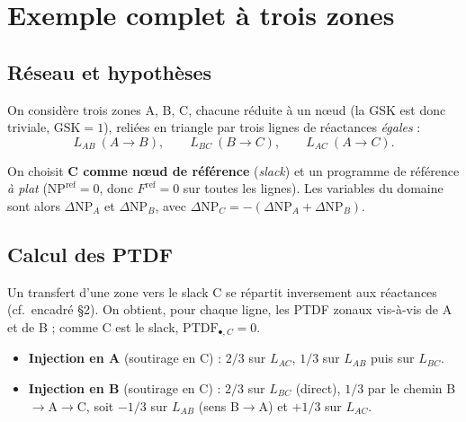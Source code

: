 \documentclass[11pt,a4paper]{article}
\newcommand{\NP}{\mathrm{NP}}
\newcommand{\PTDF}{\mathrm{PTDF}}
\newcommand{\Fref}{F^{\mathrm{ref}}}
\newcommand{\GSK}{\mathrm{GSK}}
\begin{document}
\section{Exemple complet à trois zones}
\label{sec:exemple}

\subsection{Réseau et hypothèses}

On considère trois zones A, B, C, chacune réduite à un n\oe{}ud (la GSK est
donc triviale, $\GSK=1$), reliées en triangle par trois lignes de
réactances \emph{égales} :
\[
  L_{AB}\ (A\!\to\!B),\qquad L_{BC}\ (B\!\to\!C),\qquad L_{AC}\ (A\!\to\!C).
\]

\begin{center}
\end{center}

On choisit \textbf{C comme n\oe{}ud de référence} (\emph{slack}) et un
programme de référence \emph{à plat} ($\NP^{\mathrm{ref}}=0$, donc
$\Fref=0$ sur toutes les lignes). Les variables du domaine sont alors
$\Delta\NP_A$ et $\Delta\NP_B$, avec
$\Delta\NP_C = -(\Delta\NP_A + \Delta\NP_B)$.

\subsection{Calcul des PTDF}

Un transfert d'une zone vers le slack C se répartit inversement aux
réactances (cf.\ encadré \S2). On obtient, pour chaque ligne, les PTDF
zonaux vis-à-vis de A et de B ; comme C est le slack, $\PTDF_{\bullet,C}=0$.

\begin{itemize}[nosep,leftmargin=1.4em]
  \item \textbf{Injection en A} (soutirage en C) : $2/3$ sur $L_{AC}$,
        $1/3$ sur $L_{AB}$ puis sur $L_{BC}$.
  \item \textbf{Injection en B} (soutirage en C) : $2/3$ sur $L_{BC}$
        (direct), $1/3$ par le chemin B$\to$A$\to$C, soit $-1/3$ sur
        $L_{AB}$ (sens B$\to$A) et $+1/3$ sur $L_{AC}$.
\end{itemize}
\end{document}
